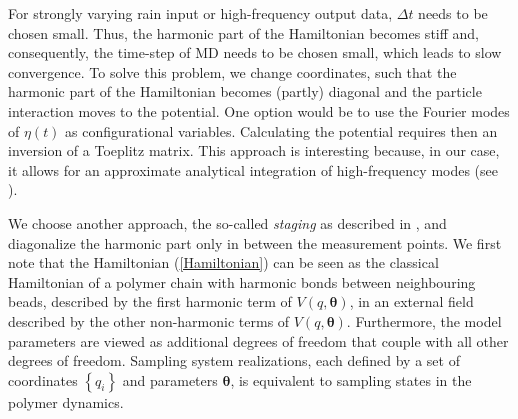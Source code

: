 \documentclass[11pt, a4paper]{article}
\newcommand{\bt}{\pmb\theta}
\begin{document}
For strongly varying rain input or high-frequency output data, $\Delta t$ needs to be chosen small. Thus, the harmonic part of the Hamiltonian becomes stiff and, consequently, the time-step of MD needs to be chosen small, which leads to slow convergence.
To solve this problem, we change coordinates, such that the harmonic part of the Hamiltonian becomes (partly) diagonal and the particle interaction moves to the potential.
One option would be to use the Fourier modes of ${\eta}(t)$ as configurational variables. Calculating the potential requires then an inversion of a Toeplitz matrix. This approach is interesting because, in our case, it allows for an approximate analytical integration of high-frequency modes (see \cite{doll_1985_fourier}).

We choose another approach, the so-called \emph{staging} as described in \cite{tuckerman1992reversible}, and diagonalize the harmonic part only in between the measurement points.
We first note that the Hamiltonian (\ref{Hamiltonian}) can be seen as the classical Hamiltonian of a polymer chain with harmonic bonds between neighbouring beads, described by the first harmonic term of $V(q,\bt)$, in an external field described by the other non-harmonic terms of $V(q,\bt)$.
Furthermore, the model parameters are viewed as additional degrees of freedom that couple with all other degrees of freedom.
Sampling system realizations, each defined by a set of coordinates $\left\{ q_i\right\}$ and parameters $\bt$, is equivalent to sampling states in the polymer dynamics.
\end{document}
